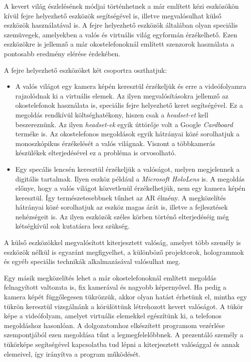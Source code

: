 A kevert világ észlelésének módjai történhetnek a már említett kézi eszközökön kívül fejre helyezhető eszközök segítségével is, illetve megvalósulhat külső eszközök használatával is.
A fejre helyezhető eszközök általában olyan speciális szemüvegek, amelyekben a valós és virtuális világ egyformán érzékelhető. Ezen eszközökre is jellemző a már okostelefonoknál említett szenzorok használata a pontosabb eredmény elérése érdekében. \cite{surgical2018ar}

A fejre helyezhető eszközöket két csoportra oszthatjuk:
\begin{itemize}
	\item A valós világot egy kamera képén keresztül érzékeljük és erre a videófolyamra rajzolódnak ki a virtuális elemek. Az ilyen megvalósításokra jellemző az okostelefonok használata is, speciális fejre helyezhető keret segítségével. Ez a megoldás rendkívül költséghatékony, hiszen csak a \textit{headset-et} kell beszereznünk. Az ilyen \textit{headset-ek} egyik úttörője volt a Google \textit{Cardboard} terméke is. Az okostelefonos megoldások egyik hátrányai közé sorolhatjuk a monoszkópikus érzékelését a valós világnak. Viszont a többkamerás készülékek elterjedésével ez a probléma is orvosolható.
	
	\item Egy specális lencsén keresztül érzékeljük a valóságot, melyen megjelennek a digitális tartalmak. Ilyen eszköz például a \textit{Microsoft HoloLens} is. A megoldás előnye, hogy a valós világot közvetlenül érzékelhetjük, nem egy kamera képén keresztül. Így természetesebbnek tűnhet az AR élmény. A megközelítés hátrányai közé sorolhatjuk az eszköz magas árát is, illetve a fejlesztések nehézségeit is. Az ilyen eszközök széles körben történő elterjedéséig még kétségkívül sok kutatásra lesz szükség.
\end{itemize}

A külső eszközökkel megvalósított kiterjesztett valóság, amelyet több személy is eszközök nélkül is egyaránt megfigyelhet, a különböző projektorok, hologrammok és egyéb speciális technikák alkalmazásával valósulhat meg.

Egy másik megközelítés lehet a már okostelefonoknál említett megoldás felnagyított valtozata is, fix kamerával és nagyobb képernyővel. Ha pedig a kamera képét függőlegesen tükrözzük, akkor olyan hatást érhetünk el, mintha egy tükrön keresztül vizsgálnánk a körülöttünk létrehozott kevert valóságot. A tükör képe a videófolyam, amelyet virtuális elemekkel egészítünk ki, a telefonos megoldáshoz hasonlóan.
A dolgozatomhoz elkészített programom vezérlése szempontjából ezen megoldása tűnt a legmegfelelőbbnek. A prezentáló személy a tükörképe segítségével kapcsolatba tud lépni a kiterjesztett valósággal és annak elemeivel, így irányítva a program működését.

